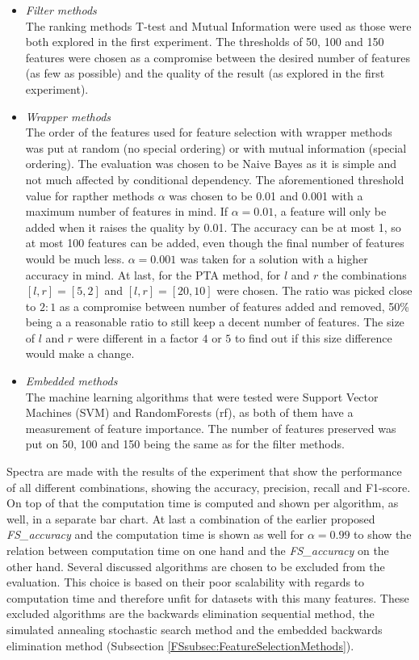\documentclass[10pt,a4paper]{report}
\begin{document}
	\begin{itemize}
		\item \textit{Filter methods} \\
		The ranking methods T-test and Mutual Information were used as those were both explored in the first experiment. The thresholds of 50, 100 and 150 features were chosen as a compromise between the desired number of features (as few as possible) and the quality of the result (as explored in the first experiment).
		\item \textit{Wrapper methods} \\
		The order of the features used for feature selection with wrapper methods was put at random (no special ordering) or with mutual information (special ordering). The evaluation was chosen to be Naive Bayes as it is simple and not much affected by conditional dependency. The aforementioned threshold value for rapther methods $\alpha$ was chosen to be 0.01 and 0.001 with a maximum number of features in mind. If $\alpha= 0.01$, a feature will only be added when it raises the quality by 0.01. The accuracy can be at most 1, so at most 100 features can be added, even though the final number of features would be much less. $\alpha = 0.001$ was taken for a solution with a higher accuracy in mind. At last, for the PTA method, for $l$ and $r$ the combinations $[l, r] = [5, 2]$ and $[l, r] = [20, 10]$ were chosen. The ratio was picked close to $2:1$ as a compromise between number of features added and removed, 50\% being a a reasonable ratio to still keep a decent number of features. The size of $l$ and $r$ were different in a factor $4$ or $5$ to find out if this size difference would make a change.
		\item \textit{Embedded methods} \\
		The machine learning algorithms that were tested were Support Vector Machines (SVM) and RandomForests (rf), as both of them have a measurement of feature importance. The number of features preserved was put on 50, 100 and 150 being the same as for the filter methods.
		
		
	\end{itemize}
	Spectra are made with the results of the experiment that show the performance of all different combinations, showing the accuracy, precision, recall and F1-score. On top of that the computation time is computed and shown per algorithm, as well, in a separate bar chart. At last a combination of the earlier proposed \textit{FS\_accuracy} and the computation time is shown as well for $\alpha = 0.99$ to show the relation between computation time on one hand and the \textit{FS\_accuracy} on the other hand. 
	Several discussed algorithms  are chosen to be excluded from the evaluation. This choice is based on their poor scalability with regards to computation time and therefore unfit for datasets with this many features. These excluded algorithms are the backwards elimination sequential method, the simulated annealing stochastic search method and the embedded backwards elimination method (Subsection \ref{FSsubsec:FeatureSelectionMethods}). 
	
\end{document}
